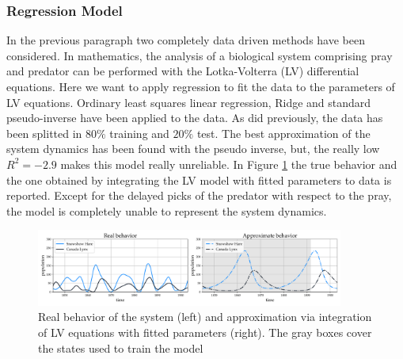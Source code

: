 \documentclass[]{article}
\begin{document}
\subsubsection{Regression Model}
In the previous paragraph two completely data driven methods have been considered. In mathematics, the analysis of a biological system comprising pray and predator can be performed with the Lotka-Volterra (LV) differential equations. Here we want to apply regression to fit the data to the parameters of LV equations. Ordinary least squares linear regression,  Ridge and standard pseudo-inverse have been applied to the data. As did previously, the data has been splitted in $80\%$ training and $20\%$ test. The best approximation of the system dynamics has been found with the pseudo inverse, but, the really low $R^2=-2.9$ makes this model really unreliable. In Figure \ref{fig:fig4} the true behavior and the one obtained by integrating the LV model with fitted parameters to data is reported. Except for the delayed picks of the predator with respect to the pray, the model is completely unable to represent the system dynamics.
\begin{figure}[!t]
	\centering
	\includegraphics[width=0.9\textwidth]{../figures/history_fit.pdf}
	\caption{Real behavior of the system (left) and approximation via integration of LV equations with fitted parameters (right). The gray boxes cover the states used to train the model}
	\label{fig:fig4}
\end{figure}
\end{document}
